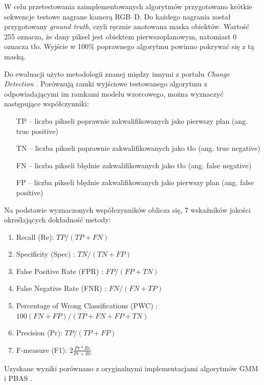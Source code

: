 \documentclass[b5paper,10pt,twoside]{article}
\begin{document}
{W celu przetestowania zaimplementowanych algorytmów przygotowano krótkie sekwencje testowe nagrane kamerą RGB--D. Do każdego nagrania został przygotowany \textit{ground truth}, czyli ręcznie anotowana maska obiektów. Wartość 255 oznacza, że dany piksel jest obiektem pierwszoplanowym, natomiast 0 oznacza tło. Wyjście w 100\% poprawnego algorytmu powinno pokrywać się z tą maską. 

Do ewaluacji użyto metodologii znanej między innymi z portalu \textit{Change Detection} \cite{}. Porównują ramki wyjściowe testowanego algorytmu z odpowiadającymi im ramkami modelu wzorcowego, można wyznaczyć następujące współczynniki:

\begin{enumerate}
\item[TP] – liczba pikseli poprawnie zakwalifikowanych jako pierwszy plan (ang. true positive)
\item[TN] – liczba pikseli poprawnie zakwalifikowanych jako tło (ang. true negative)
\item[FN] – liczba pikseli błędnie zakwalifikowanych jako tło (ang. false negative)
\item[FP] – liczba pikseli błędnie zakwalifikowanych jako pierwszy plan (ang. false positive)
\end{enumerate}

\noindent Na podstawie wyznaczonych współczynników oblicza się, 7 wskaźników jakości określających dokładność metody:

\begin{enumerate}

\item Recall (Re): $TP/(TP + FN)$
\item Specificity (Spec) : $TN/(TN + FP)$
\item False Positive Rate (FPR) : $FP/(FP + TN)$
\item False Negative Rate (FNR) : $FN/(FN + TP)$
\item Percentage of Wrong Classifications (PWC) : $100(FN + FP)/(TP + FN + FP + TN)$
\item Precision (Pr): $TP/(TP + FP)$
\item F-measure (F1): $2\frac{Pr*Re}{Pr+Rr}$

\end{enumerate}

Uzyskane wyniki porównano z oryginalnymi implementacjami algorytmów GMM \cite{} i PBAS \cite{}. %


}
\end{document}
